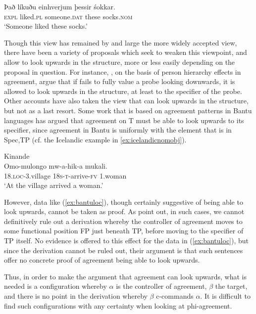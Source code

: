 \documentclass[output=paper
,modfonts
,nonflat]{langsci/langscibook}
\begin{document}
\begin{exe}
	\ex
	\gll Það líkuðu einhverjum þessir śokkar.\\
	\textsc{expl} liked.\textsc{pl} someone.\textsc{dat} these socks.\textsc{nom}\\
	\glt `Someone liked these socks.' \label{ex:icelandicnomobj}
\end{exe}
Though this view has remained by and large the more widely accepted view, there have been a variety of proposals which seek to weaken this viewpoint, and allow {\agr} to look upwards in the structure, more or less easily depending on the proposal in question.
For instance, \citet{bejarrezac2009}, on the basis of person hierarchy effects in agreement, argue that if {\agr} fails to fully value a probe looking downwards, it is allowed to look upwards in the structure, at least to the specifier of the probe.
Other accounts have also taken the view that {\agr} can look upwards in the structure, but not as a last resort.
Some work that is based on agreement patterns in Bantu languages has argued that agreement on T must be able to look upwards to its specifier, since agreement in Bantu is uniformly with the element that is in Spec,TP (cf. the Icelandic example in \ref{ex:icelandicnomobj}).

\begin{exe}
	\ex Kinande \citep{Baker2003}\\
	\gll Omo-mulongo mw-a-hik-a mukali.\\
	\textsc{18.loc}-3.village \textsc{18s-t-}arrive-\textsc{fv} 1.woman\\
	\glt `At the village arrived a woman.' \label{ex:bantuloc}
\end{exe}
However, data like (\ref{ex:bantuloc}), though certainly suggestive of {\agr} being able to look upwards, cannot be taken as proof.
As \citet{premingerpolinsky2015} point out, in such cases, we cannot definitively rule out a derivation whereby the controller of agreement moves to some functional position FP just beneath TP, before moving to the specifier of TP itself.
No evidence is offered to this effect for the data in (\ref{ex:bantuloc}), but since the derivation cannot be ruled out, their argument is that such sentences offer no concrete proof of agreement being able to look upwards.

Thus, in order to make the argument that agreement can look upwards, what is needed is a configuration whereby $\alpha$ is the controller of agreement, $\beta$ the target, and there is no point in the derivation whereby $\beta$ c-commands $\alpha$.
It is difficult to find such configurations with any certainty when looking at phi-agreement.
\end{document}
